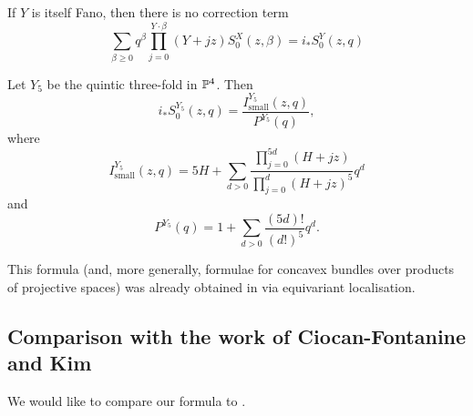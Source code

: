 \begin{cor}
 If $Y$ is itself Fano, then there is no correction term
 \[
  \sum_{\beta\geq 0} q^\beta\prod_{j=0}^{Y\cdot\beta}(Y+jz)S_0^X(z,\beta) = i_*S_0^Y(z,q)
 \]
\end{cor}

\begin{cor}
 Let $Y_5$ be the quintic three-fold in $\mathbb P^4$. Then
 \[
  i_*S_0^{Y_5}(z,q)=\frac{I_{\text{small}}^{Y_5}(z,q)}{P^{Y_5}(q)},
 \]
where
\[
 I_{\text{small}}^{Y_5}(z,q)=5H+\sum_{d>0}\frac{\prod_{j=0}^{5d}(H+jz)}{\prod_{j=0}^{d}(H+jz)^5}q^d
\]
and
\[
 P^{Y_5}(q)=1+\sum_{d>0}\frac{(5d)!}{(d!)^5}q^d.
\]
\end{cor}

\begin{remark}
 This formula (and, more generally, formulae for concavex bundles over products of projective spaces) was already obtained in \cite[Theorem 1]{CZ-mirror} via equivariant localisation.
\end{remark}

\subsection{Comparison with the work of Ciocan-Fontanine and Kim}

We would like to compare our formula to \cite[Corollary 5.5.1]{CF-K-wallcrossing}.

